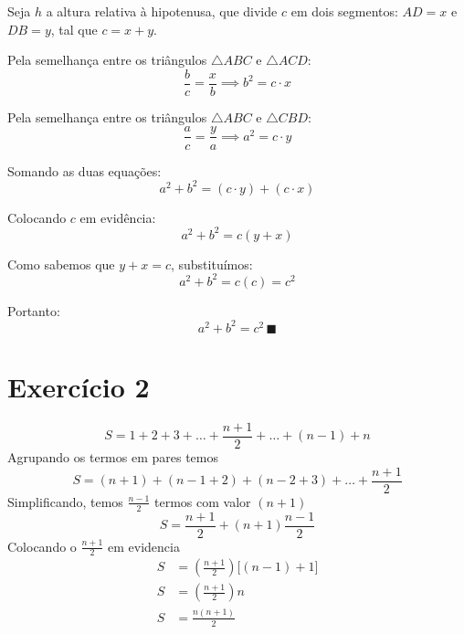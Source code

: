 \documentclass[11pt,reqno,a4paper]{amsart}
\begin{document}
Seja $h$ a altura relativa à hipotenusa, que divide $c$ em dois segmentos: $AD = x$ e $DB = y$, tal que $c = x + y$.

Pela semelhança entre os triângulos $\triangle ABC$ e $\triangle ACD$:
\begin{equation}
\frac{b}{c} = \frac{x}{b} \implies b^2 = c \cdot x
\end{equation}

Pela semelhança entre os triângulos $\triangle ABC$ e $\triangle CBD$:
\begin{equation}
\frac{a}{c} = \frac{y}{a} \implies a^2 = c \cdot y
\end{equation}

Somando as duas equações:
\begin{equation}
a^2 + b^2 = (c \cdot y) + (c \cdot x)
\end{equation}

Colocando $c$ em evidência:
\begin{equation}
a^2 + b^2 = c(y + x)
\end{equation}

Como sabemos que $y + x = c$, substituímos:
\begin{equation}
a^2 + b^2 = c(c) = c^2
\end{equation}

Portanto:
\textbf{\[ a^2 + b^2 = c^2\, \blacksquare \]}

\newpage
\section*{Exercício 2}
\begin{equation}
    S = 1 + 2 + 3 + \dots + \frac{n+1}{2} + \dots + (n-1) + n
\end{equation}
Agrupando os termos em pares temos
\begin{equation}
    S = (n + 1) + (n - 1 + 2) + (n - 2 + 3) + \dots + \frac{n+1}{2}
\end{equation}
Simplificando, temos $\frac{n-1}{2}$ termos com valor $(n + 1)$
\begin{equation}
    S = \frac{n+1}{2} + (n+1)\frac{n-1}{2}
\end{equation}
Colocando o $\frac{n+1}{2}$ em evidencia
\begin{equation}
\begin{aligned}
    S &= \left(\frac{n+1}{2}\right)\bigl[(n-1) + 1\bigr] \\
    S &= \left(\frac{n+1}{2}\right) n \\
    S &= \frac{n(n+1)}{2}
\end{aligned}
\end{equation}
\end{document}
